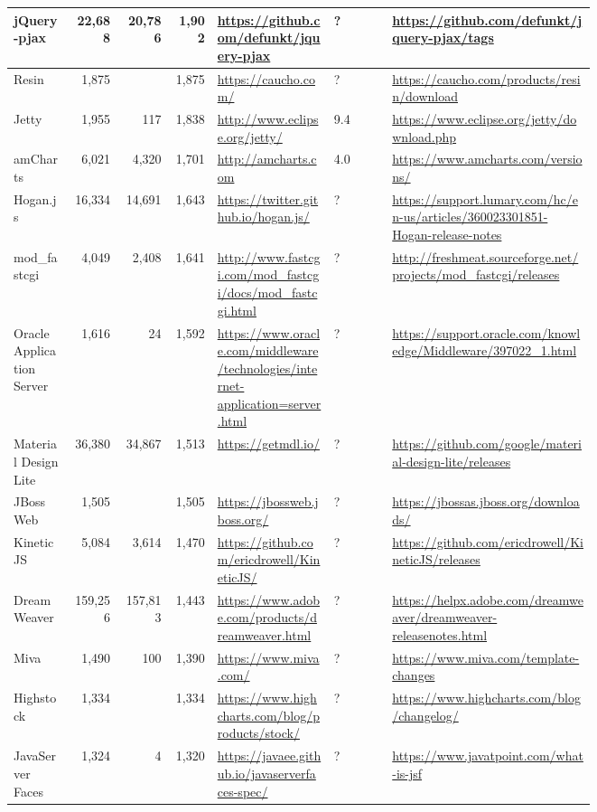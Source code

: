 \begin{landscape}
\begin{longtable}{|p{0.1\linewidth}|r|r|r|p{0.2\linewidth}|p{0.1\linewidth}|p{0.35\linewidth}|}
		jQuery-pjax &22,688 &20,786 &1,902 &\url{https://github.com/defunkt/jquery-pjax} &? &\url{https://github.com/defunkt/jquery-pjax/tags} \\\hline
		Resin &1,875 & &1,875 &\url{https://caucho.com/} &? &\url{https://caucho.com/products/resin/download} \\\hline
		Jetty &1,955 &117 &1,838 &\url{http://www.eclipse.org/jetty/} &9.4 &\url{https://www.eclipse.org/jetty/download.php} \\\hline
		amCharts &6,021 &4,320 &1,701 &\url{http://amcharts.com} &4.0 &\url{https://www.amcharts.com/versions/} \\\hline
		Hogan.js &16,334 &14,691 &1,643 &\url{https://twitter.github.io/hogan.js/} &? &\url{https://support.lumary.com/hc/en-us/articles/360023301851-Hogan-release-notes} \\\hline
		mod\_fastcgi &4,049 &2,408 &1,641 &\url{http://www.fastcgi.com/mod\_fastcgi/docs/mod\_fastcgi.html} &? &\url{http://freshmeat.sourceforge.net/projects/mod\_fastcgi/releases} \\\hline
		Oracle Application Server &1,616 &24 &1,592 &\url{https://www.oracle.com/middleware/technologies/internet-application=server.html} &? &\url{https://support.oracle.com/knowledge/Middleware/397022\_1.html} \\\hline
		Material Design Lite &36,380 &34,867 &1,513 &\url{https://getmdl.io/} &? &\url{https://github.com/google/material-design-lite/releases} \\\hline
		JBoss Web &1,505 & &1,505 &\url{https://jbossweb.jboss.org/} &? &\url{https://jbossas.jboss.org/downloads/} \\\hline
		KineticJS &5,084 &3,614 &1,470 &\url{https://github.com/ericdrowell/KineticJS/} &? &\url{https://github.com/ericdrowell/KineticJS/releases} \\\hline
		DreamWeaver &159,256 &157,813 &1,443 &\url{https://www.adobe.com/products/dreamweaver.html} &? &\url{https://helpx.adobe.com/dreamweaver/dreamweaver-releasenotes.html} \\\hline
		Miva &1,490 &100 &1,390 &\url{https://www.miva.com/} &? &\url{https://www.miva.com/template-changes} \\\hline
		Highstock &1,334 & &1,334 &\url{https://www.highcharts.com/blog/products/stock/} &? &\url{https://www.highcharts.com/blog/changelog/} \\\hline
		JavaServer Faces &1,324 &4 &1,320 &\url{https://javaee.github.io/javaserverfaces-spec/} &? &\url{https://www.javatpoint.com/what-is-jsf} \\\hline

\end{longtable}
\end{landscape}
